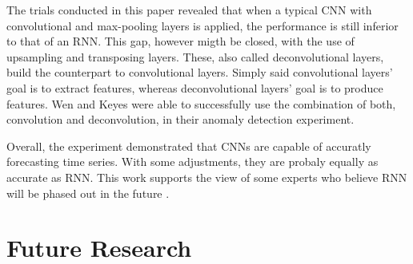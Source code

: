The trials conducted in this paper revealed that when a typical CNN with convolutional and max-pooling layers is applied, the performance is still inferior to that of an RNN. This gap, however migth be closed, with the use of upsampling and transposing layers. These, also called deconvolutional layers, build the counterpart to convolutional layers. Simply said convolutional layers' goal is to extract features, whereas deconvolutional layers' goal is to produce features. Wen and Keyes \parencite*{Wen2019} were able to successfully use the combination of both, convolution and deconvolution, in their anomaly detection experiment.

Overall, the experiment demonstrated that CNNs are capable of accuratly forecasting time series. With some adjustments, they are probaly equally as accurate as RNN. This work supports the view of some experts who believe RNN will be phased out in the future \parencite{Culurciello2018} \parencite{Bai2018}. 

\section{Future Research}




